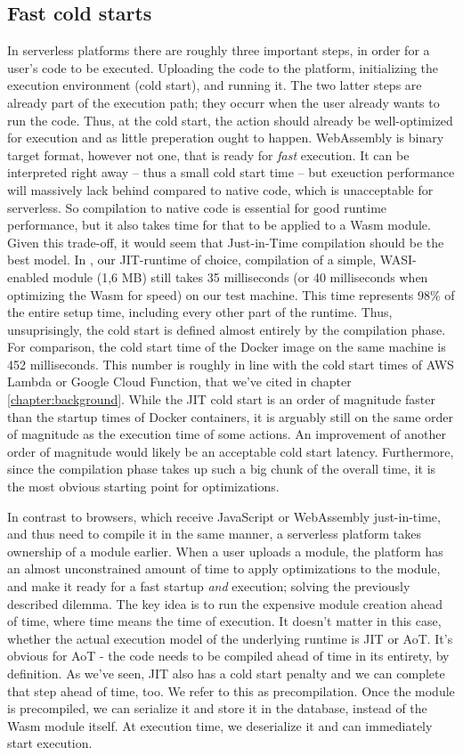 \subsection{Fast cold starts}
In serverless platforms there are roughly three important steps, in order for a user's code to be executed. Uploading the code to the platform, initializing the execution environment (cold start), and running it. The two latter steps are already part of the execution path; they occurr when the user already wants to run the code. Thus, at the cold start, the action should already be well-optimized for execution and as little preperation ought to happen. WebAssembly is binary target format, however not one, that is ready for \emph{fast} execution. It can be interpreted right away -- thus a small cold start time -- but exeuction performance will massively lack behind compared to native code, which is unacceptable for serverless. So compilation to native code is essential for good runtime performance, but it also takes time for that to be applied to a Wasm module. Given this trade-off, it would seem that Just-in-Time compilation should be the best model. In , our JIT-runtime of choice, compilation of a simple, WASI-enabled module (1,6 MB) still takes 35 milliseconds (or 40 milliseconds when optimizing the Wasm for speed) on our test machine. This time represents 98\% of the entire setup time, including every other part of the runtime. Thus, unsuprisingly, the cold start is defined almost entirely by the compilation phase. For comparison, the cold start time of the  Docker image on the same machine is 452 milliseconds. This number is roughly in line with the cold start times of AWS Lambda or Google Cloud Function, that we've cited in chapter \ref{chapter:background}. While the JIT cold start is an order of magnitude faster than the startup times of Docker containers, it is arguably still on the same order of magnitude as the execution time of some actions. An improvement of another order of magnitude would likely be an acceptable cold start latency.
Furthermore, since the compilation phase takes up such a big chunk of the overall time, it is the most obvious starting point for optimizations.

In contrast to browsers, which receive JavaScript or WebAssembly just-in-time, and thus need to compile it in the same manner, a serverless platform takes ownership of a module earlier. When a user uploads a module, the platform has an almost unconstrained amount of time to apply optimizations to the module, and make it ready for a fast startup \emph{and} execution; solving the previously described dilemma. The key idea is to run the expensive module creation ahead of time, where time means the time of execution. It doesn't matter in this case, whether the actual execution model of the underlying runtime is JIT or AoT. It's obvious for AoT - the code needs to be compiled ahead of time in its entirety, by definition. As we've seen, JIT also has a cold start penalty and we can complete that step ahead of time, too. We refer to this as precompilation. Once the module is precompiled, we can serialize it and store it in the database, instead of the Wasm module itself. At execution time, we deserialize it and can immediately start execution.

